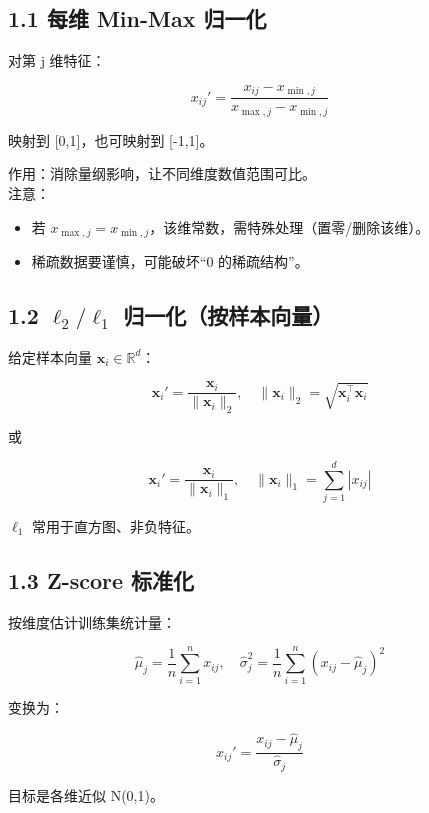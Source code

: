 \subsection{1.1 每维 Min-Max
归一化}\label{ux6bcfux7ef4-min-max-ux5f52ux4e00ux5316}

对第 j 维特征：

\[
x_{ij}'=\frac{x_{ij}-x_{\min,j}}{x_{\max,j}-x_{\min,j}}
\]

映射到 {[}0,1{]}，也可映射到 {[}-1,1{]}。

作用：消除量纲影响，让不同维度数值范围可比。\\
注意：

\begin{itemize}
\tightlist
\item
  若 \(x_{\max,j}=x_{\min,j}\)，该维常数，需特殊处理（置零/删除该维）。
\item
  稀疏数据要谨慎，可能破坏``0 的稀疏结构''。
\end{itemize}

\subsection{\texorpdfstring{1.2 \(\ell_2/\ell_1\)
归一化（按样本向量）}{1.2 \textbackslash ell\_2/\textbackslash ell\_1 归一化（按样本向量）}}\label{ell_2ell_1-ux5f52ux4e00ux5316ux6309ux6837ux672cux5411ux91cf}

给定样本向量 \(\mathbf{x}_i\in\mathbb{R}^d\)：

\[
\mathbf{x}_i'=\frac{\mathbf{x}_i}{\|\mathbf{x}_i\|_2},\quad
\|\mathbf{x}_i\|_2=\sqrt{\mathbf{x}_i^\top\mathbf{x}_i}
\]

或

\[
\mathbf{x}_i'=\frac{\mathbf{x}_i}{\|\mathbf{x}_i\|_1},\quad
\|\mathbf{x}_i\|_1=\sum_{j=1}^d |x_{ij}|
\]

\(\ell_1\) 常用于直方图、非负特征。

\subsection{1.3 Z-score 标准化}\label{z-score-ux6807ux51c6ux5316}

按维度估计训练集统计量：

\[
\hat\mu_j=\frac{1}{n}\sum_{i=1}^n x_{ij},\quad
\hat\sigma_j^2=\frac{1}{n}\sum_{i=1}^n (x_{ij}-\hat\mu_j)^2
\]

变换为：

\[
x_{ij}'=\frac{x_{ij}-\hat\mu_j}{\hat\sigma_j}
\]

目标是各维近似 N(0,1)。

